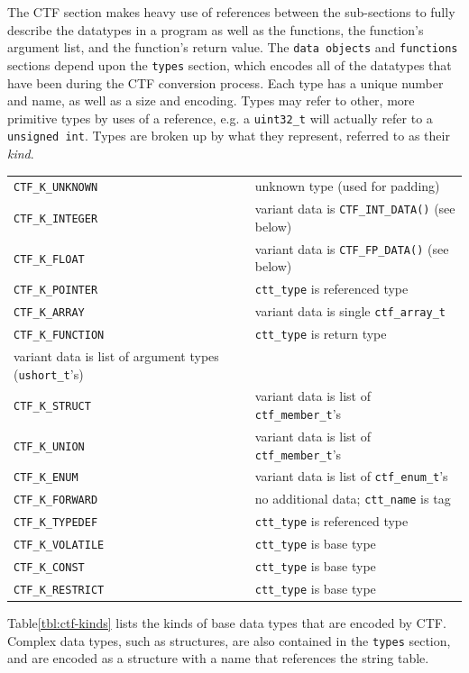 The CTF section makes heavy use of references between the sub-sections
to fully describe the datatypes in a program as well as the functions,
the function's argument list, and the function's return value.  The
\verb|data objects| and \verb|functions| sections depend upon the
\verb|types| section, which encodes all of the datatypes that have
been during the CTF conversion process.  Each type has a unique number
and name, as well as a size and encoding.  Types may refer to other,
more primitive types by uses of a reference, e.g. a \verb|uint32_t|
will actually refer to a \verb|unsigned int|.  Types are broken up by
what they represent, referred to as their \emph{kind}.

\begin{tabular}{|l|l}
\hline
\verb|CTF_K_UNKNOWN|    & unknown type (used for padding) \\
\verb|CTF_K_INTEGER|    & variant data is \verb|CTF_INT_DATA()| (see below)\\
\verb|CTF_K_FLOAT|      & variant data is \verb|CTF_FP_DATA()| (see below)\\
\verb|CTF_K_POINTER|    & \verb|ctt_type| is referenced type\\
\verb|CTF_K_ARRAY|      & variant data is single \verb|ctf_array_t|\\
  \verb|CTF_K_FUNCTION| & \verb|ctt_type| is return type\\
  variant data is list of argument types (\verb|ushort_t|'s)\\
\verb|CTF_K_STRUCT|     & variant data is list of \verb|ctf_member_t|'s\\
\verb|CTF_K_UNION|      & variant data is list of \verb|ctf_member_t|'s\\
\verb|CTF_K_ENUM|       & variant data is list of \verb|ctf_enum_t|'s\\
\verb|CTF_K_FORWARD|    & no additional data; \verb|ctt_name| is tag\\
\verb|CTF_K_TYPEDEF|    & \verb|ctt_type| is referenced type\\
\verb|CTF_K_VOLATILE|   & \verb|ctt_type| is base type\\
\verb|CTF_K_CONST|      & \verb|ctt_type| is base type\\
\verb|CTF_K_RESTRICT|   & \verb|ctt_type| is base type\\
\hline
\end{tabular}

Table\ref{tbl:ctf-kinds} lists the kinds of base data types that are
encoded by CTF.  Complex data types, such as structures, are also
contained in the \verb|types| section, and are encoded as a structure
with a name that references the string table.

